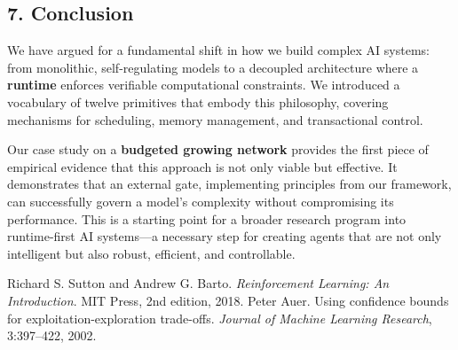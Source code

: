 \documentclass[
]{article}
\begin{document}
\hypertarget{conclusion}{%
\subsection{7. Conclusion}\label{conclusion}}

We have argued for a fundamental shift in how we build complex AI
systems: from monolithic, self-regulating models to a decoupled
architecture where a \textbf{runtime} enforces verifiable computational
constraints. We introduced a vocabulary of twelve primitives that embody
this philosophy, covering mechanisms for scheduling, memory management,
and transactional control.

Our case study on a \textbf{budgeted growing network} provides the first
piece of empirical evidence that this approach is not only viable but
effective. It demonstrates that an external gate, implementing
principles from our framework, can successfully govern a model's
complexity without compromising its performance. This is a starting
point for a broader research program into runtime-first AI systems---a
necessary step for creating agents that are not only intelligent but
also robust, efficient, and controllable.

\begin{thebibliography}{9}
 Richard S. Sutton and Andrew G. Barto. \emph{Reinforcement Learning: An Introduction}. MIT Press, 2nd edition, 2018.
 Peter Auer. Using confidence bounds for exploitation-exploration trade-offs. \emph{Journal of Machine Learning Research}, 3:397--422, 2002.
\end{thebibliography}
\end{document}
